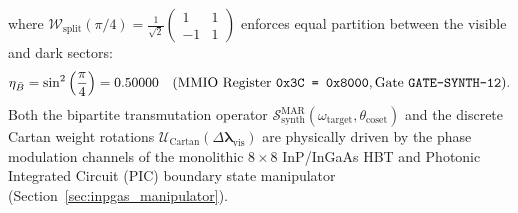 \documentclass[11pt,onecolumn]{article}
\begin{document}
where $\mathcal{W}_{\text{split}}(\pi/4) = \frac{1}{\sqrt{2}}\begin{pmatrix} 1 & 1 \\ -1 & 1 \end{pmatrix}$ enforces equal partition between the visible and dark sectors:
\begin{equation}
\eta_{\bar{B}} = \sin^2\left(\frac{\pi}{4}\right) = 0.50000 \quad (\text{MMIO Register \texttt{0x3C = 0x8000}}, \text{Gate \texttt{GATE-SYNTH-12}}).
\label{eq:hadamard_split}
\end{equation}
Both the bipartite transmutation operator $\mathcal{S}_{\text{synth}}^{\text{MAR}}(\omega_{\text{target}}, \theta_{\text{coset}})$ and the discrete Cartan weight rotations $\mathcal{U}_{\text{Cartan}}(\Delta\bm{\lambda}_{\text{vis}})$ are physically driven by the phase modulation channels of the monolithic $8\times 8$ InP/InGaAs HBT and Photonic Integrated Circuit (PIC) boundary state manipulator (Section~\ref{sec:inpgas_manipulator}).
\end{document}
